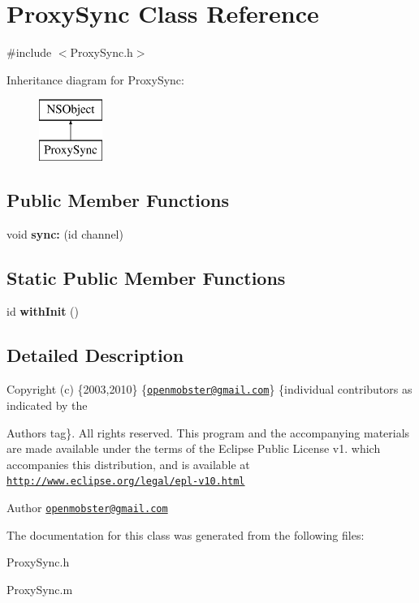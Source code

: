 \hypertarget{interface_proxy_sync}{
\section{\-Proxy\-Sync \-Class \-Reference}
\label{interface_proxy_sync}
}


{\ttfamily \#include $<$\-Proxy\-Sync.\-h$>$}

\-Inheritance diagram for \-Proxy\-Sync\-:\begin{figure}[H]
\begin{center}
\leavevmode
\includegraphics[height=2.000000cm]{interface_proxy_sync}
\end{center}
\end{figure}
\subsection*{\-Public \-Member \-Functions}
\begin{DoxyCompactItemize}
\item 
\hypertarget{interface_proxy_sync_ab745dfcce18738593924bd793fe15f8f}{
void {\bfseries sync\-:} (id channel)}
\label{interface_proxy_sync_ab745dfcce18738593924bd793fe15f8f}

\end{DoxyCompactItemize}
\subsection*{\-Static \-Public \-Member \-Functions}
\begin{DoxyCompactItemize}
\item 
\hypertarget{interface_proxy_sync_a978924381d291e1601844437ea2eff77}{
id {\bfseries with\-Init} ()}
\label{interface_proxy_sync_a978924381d291e1601844437ea2eff77}

\end{DoxyCompactItemize}


\subsection{\-Detailed \-Description}
\-Copyright (c) \{2003,2010\} \{\href{mailto:openmobster@gmail.com}{\tt openmobster@gmail.\-com}\} \{individual contributors as indicated by the \begin{DoxyAuthor}{\-Authors}
tag\}. \-All rights reserved. \-This program and the accompanying materials are made available under the terms of the \-Eclipse \-Public \-License v1. which accompanies this distribution, and is available at \href{http://www.eclipse.org/legal/epl-v10.html}{\tt http\-://www.\-eclipse.\-org/legal/epl-\/v10.\-html}
\end{DoxyAuthor}
\begin{DoxyAuthor}{\-Author}
\href{mailto:openmobster@gmail.com}{\tt openmobster@gmail.\-com} 
\end{DoxyAuthor}


\-The documentation for this class was generated from the following files\-:\begin{DoxyCompactItemize}
\item 
\-Proxy\-Sync.\-h\item 
\-Proxy\-Sync.\-m\end{DoxyCompactItemize}
